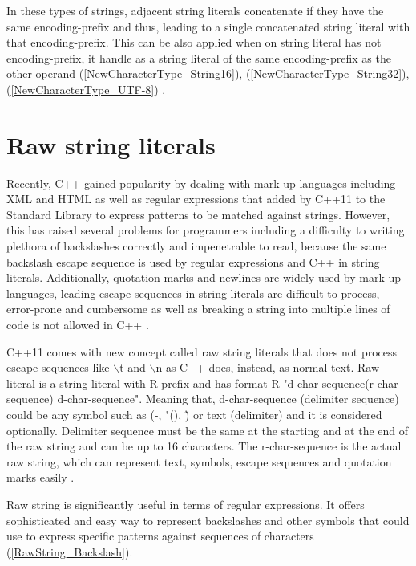 \documentclass[11pt]{report}
\begin{document}
In these types of strings, adjacent string literals concatenate if they have the same encoding-prefix and thus, leading to a single concatenated string literal with that encoding-prefix. This can be also applied when on string literal has not encoding-prefix, it handle as a string literal of the same encoding-prefix as the other operand (\ref{NewCharacterType_String16}), (\ref{NewCharacterType_String32}), (\ref{NewCharacterType_UTF-8}) \cite{ ISO:2011:Cpplanguage}.


\section{Raw string literals}
\label{section: Raw string literals}
Recently, C++ gained popularity by dealing with mark-up languages including XML and HTML as well as regular expressions that added by C++11 to the Standard Library to express patterns to be matched against strings. However, this has raised several problems for programmers including a difficulty to writing plethora of backslashes correctly and impenetrable to read, because the same backslash escape sequence is used by regular expressions and C++ in string literals. Additionally, quotation marks and newlines are widely used by mark-up languages, leading escape sequences in string literals are difficult to process, error-prone and cumbersome as well as breaking a string into multiple lines of code is not allowed in C++ \cite{ISO:2011:Cpplanguage}.


C++11 comes with new concept called raw string literals that does not process escape sequences like $\backslash$t and $\backslash$n as C++ does, instead, as normal text. Raw literal is a string literal with R prefix and has format R "d-char-sequence(r-char-sequence) d-char-sequence". Meaning that, d-char-sequence (delimiter sequence) could be any symbol such as (-, "(), \~) or text (delimiter) and it is considered optionally. Delimiter sequence must be the same at the starting and at the end of the raw string and can be up to 16 characters. The r-char-sequence is the actual raw string, which can represent text, symbols, escape sequences and quotation marks easily \cite{Gregorie:professionalcpp}.


Raw string is significantly useful in terms of regular expressions. It offers sophisticated and easy way to represent backslashes and other symbols that could use to express specific patterns against sequences of characters (\ref{RawString_Backslash}).
\end{document}
